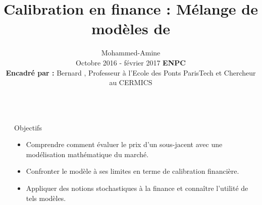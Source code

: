 \documentclass[final]{beamer}
\title{Calibration en finance : Mélange de modèles de \bsc{Black-Scholes}} %
\author{\bsc{Kheldouni} Mohammed-Amine
\\\vspace{1cm} Octobre 2016 - février 2017 \hspace{3cm} \textbf{ENPC}
\\\vspace{1cm} \textbf{Encadr\'e par :}
Bernard \bsc{Lapeyre}, Professeur à l'Ecole des Ponts ParisTech et Chercheur au CERMICS} %
\institute{\vspace{-2cm}}
\newlength{\sepwid}
\newlength{\onecolwid}
\begin{document}

\setlength{\belowcaptionskip}{2ex} %
\setlength\belowdisplayshortskip{2ex} %

\begin{frame}[t] %

\begin{columns}[t] %

\begin{column}{\sepwid}\end{column} %

\begin{column}{\onecolwid} %


\begin{alertblock}{Objectifs}
\begin{itemize}
  \item Comprendre comment évaluer le prix d'un sous-jacent avec une modélisation mathématique du marché.
  \item Confronter le modèle à ses limites en terme de calibration financière.
  \item Appliquer des notions stochastiques à la finance et connaître l'utilité de tels modèles.
\end{itemize}

\end{alertblock}



\end{column}
\end{columns}
\end{frame}
\end{document}
